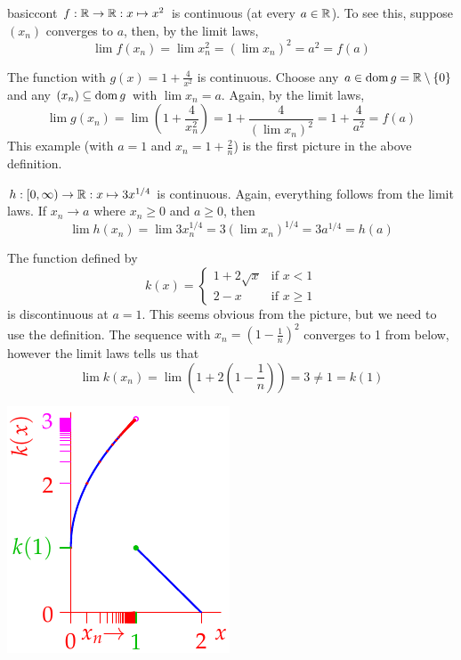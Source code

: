 \begin{examples}{}{basiccont}
	\exstart $f:\mathbb{R}\to\mathbb{R}:x\mapsto x^2$ is continuous (at every $a\in\mathbb{R}$). To see this, suppose $(x_n)$ converges to $a$, then, by the limit laws,
  \[
  	\lim f(x_n) =\lim x_n^2 =(\lim x_n)^2 =a^2 =f(a)
  \]
  
  \begin{enumerate}\setcounter{enumi}{1}
	  \item The function with $g(x)=1+\frac 4{x^2}$ is continuous. Choose any $a\in\operatorname{dom} g=\mathbb{R}\setminus\{0\}$ and any $(x_n)\subseteq\operatorname{dom} g$ with $\lim x_n=a$. Again, by the limit laws,
	  \[
	  	\lim g(x_n) =\lim\left(1+\frac 4{x_n^2}\right) 
	  	=1+\frac 4{(\lim x_n)^2} =1+\frac 4{a^2}=f(a)
	  \]
	  This example (with $a=1$ and $x_n=1+\frac 2n$) is the first picture in the above definition.
  
  	\item $h:[0,\infty)\to\mathbb{R}:x\mapsto 3x^{1/4}$ is continuous. Again, everything follows from the limit laws. If $x_n\to a$ where $x_n\ge 0$ and $a\ge 0$, then
  	\[
  		\lim h(x_n) =\lim 3x_n^{1/4} =3(\lim x_n)^{1/4} =3a^{1/4} =h(a)
  	\]
  
		\begin{minipage}[t]{0.70\linewidth}\vspace{-5pt}
	  	\item The function defined by
		  \[
		  	k(x)=
		  	\begin{cases}
		  		1+2\sqrt x&\text{if }x<1\\
		  		2-x&\text{if }x\ge 1
		  	\end{cases}
		  \]
	  	is discontinuous at $a=1$. This seems obvious from the picture, but we need to use the definition. The sequence with $x_n=(1-\frac 1n)^2$ converges to 1 from below, however the limit laws tells us that
	  	\[
	  		\lim k(x_n) =\lim\left(1+2\left(1-\frac 1n\right)\right)
	  		=3\neq 1 =k(1)
	  	\]
		\end{minipage}
		\hfill
		\begin{minipage}[t]{0.29\linewidth}\vspace{-5pt}
			\flushright\includegraphics[scale=0.95]{cont-ex2}
		\end{minipage}


\end{enumerate}
\end{examples}
